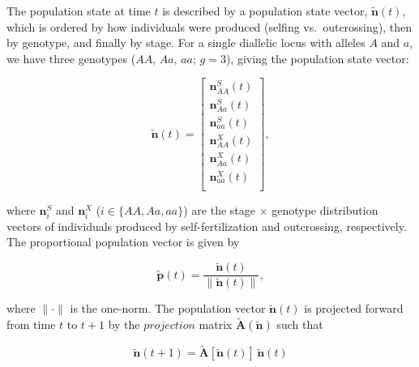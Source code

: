 \documentclass[11pt]{article}
\def\mbf#1{\mathbf{#1}}
\begin{document}
The population state at time $t$ is described by a population state vector, $\tilde{\mbf{n}}(t)$, which is ordered by how individuals were produced (selfing vs.~outcrossing), then by genotype, and finally by stage. For a single diallelic locus with alleles $A$ and $a$, we have three genotypes ($AA,\, Aa,\, aa$; $g = 3$), giving the population state vector:
\begin{linenomath*}
\begin{equation} \label{eq:PopStateVec}
	\tilde{\mbf{n}}(t) =  \left[
								\begin{array}{c}
									\mbf{n}^{S}_{AA}(t) \\
									\mbf{n}^{S}_{Aa}(t) \\
									\mbf{n}^{S}_{aa}(t) \\ \hline
									\mbf{n}^{X}_{AA}(t) \\
									\mbf{n}^{X}_{Aa}(t) \\
									\mbf{n}^{X}_{aa}(t) \\ 
						\end{array} \right],
\end{equation}
\end{linenomath*}

\noindent where $\mbf{n}^{S}_{i}$ and $\mbf{n}^{X}_{i}$ ($i \in \{AA,Aa,aa\}$) are the stage $\times$ genotype distribution vectors of individuals produced by self-fertilization and outcrossing, respectively. The proportional population vector is given by
\begin{linenomath*}
\begin{equation} \label{eq:propPopVec}
	\tilde{\mbf{p}}(t) = \frac{\tilde{\mbf{n}}(t)}{ \| \tilde{\mbf{n}}(t) \|},
\end{equation}
\end{linenomath*}

\noindent where $\| \cdot \|$ is the one-norm. The population vector $\tilde{\mbf{n}}(t)$ is projected forward from time $t$ to $t + 1$ by the $projection$ matrix $\tilde{\mbf{A}}(\tilde{\mbf{n}})$ such that 
\begin{linenomath*}
\begin{equation}
	\tilde{\mbf{n}}(t + 1) = \tilde{\mbf{A}}[\tilde{\mbf{n}}(t)] \, \tilde{\mbf{n}}(t)
\end{equation}
\end{linenomath*}
\end{document}
